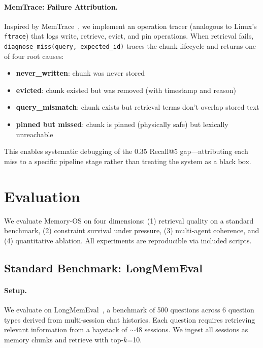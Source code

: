 \documentclass[10pt,twocolumn]{article}
\begin{document}
\paragraph{MemTrace: Failure Attribution.} Inspired by MemTrace~\cite{memtrace2026}, we implement an operation tracer (analogous to Linux's \texttt{ftrace}) that logs write, retrieve, evict, and pin operations. When retrieval fails, \texttt{diagnose\_miss(query, expected\_id)} traces the chunk lifecycle and returns one of four root causes:
\begin{itemize}[leftmargin=*,nosep]
  \item \textbf{never\_written}: chunk was never stored
  \item \textbf{evicted}: chunk existed but was removed (with timestamp and reason)
  \item \textbf{query\_mismatch}: chunk exists but retrieval terms don't overlap stored text
  \item \textbf{pinned but missed}: chunk is pinned (physically safe) but lexically unreachable
\end{itemize}
This enables systematic debugging of the 0.35 Recall@5 gap---attributing each miss to a specific pipeline stage rather than treating the system as a black box.

\section{Evaluation}
\label{sec:eval}

We evaluate Memory-OS on four dimensions: (1) retrieval quality on a standard benchmark, (2) constraint survival under pressure, (3) multi-agent coherence, and (4) quantitative ablation. All experiments are reproducible via included scripts.

\subsection{Standard Benchmark: LongMemEval}

\paragraph{Setup.} We evaluate on LongMemEval~\cite{longmemeval2024}, a benchmark of 500 questions across 6 question types derived from multi-session chat histories. Each question requires retrieving relevant information from a haystack of $\sim$48 sessions. We ingest all sessions as memory chunks and retrieve with top-$k$=10.
\end{document}
